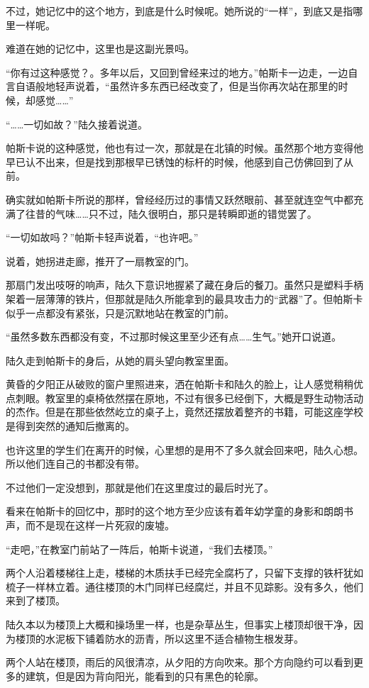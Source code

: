 不过，她记忆中的这个地方，到底是什么时候呢。她所说的“一样”，到底又是指哪里一样呢。

难道在她的记忆中，这里也是这副光景吗。

“你有过这种感觉？。多年以后，又回到曾经来过的地方。”帕斯卡一边走，一边自言自语般地轻声说着，“虽然许多东西已经改变了，但是当你再次站在那里的时候，却感觉……”

“……一切如故？”陆久接着说道。

帕斯卡说的这种感觉，他也有过一次，那就是在北镇的时候。虽然那个地方变得他早已认不出来，但是找到那根早已锈蚀的标杆的时候，他感到自己仿佛回到了从前。

确实就如帕斯卡所说的那样，曾经经历过的事情又跃然眼前、甚至就连空气中都充满了往昔的气味……只不过，陆久很明白，那只是转瞬即逝的错觉罢了。

“一切如故吗？”帕斯卡轻声说着，“也许吧。”

说着，她拐进走廊，推开了一扇教室的门。

那扇门发出吱呀的响声，陆久下意识地握紧了藏在身后的餐刀。虽然只是塑料手柄架着一层薄薄的铁片，但那就是陆久所能拿到的最具攻击力的“武器”了。但帕斯卡似乎一点都没有紧张，只是沉默地站在教室的门前。

“虽然多数东西都没有变，不过那时候这里至少还有点……生气。”她开口说道。

陆久走到帕斯卡的身后，从她的肩头望向教室里面。

黄昏的夕阳正从破败的窗户里照进来，洒在帕斯卡和陆久的脸上，让人感觉稍稍优点刺眼。教室里的桌椅依然摆在原地，不过有很多已经倒下，大概是野生动物活动的杰作。但是在那些依然屹立的桌子上，竟然还摆放着整齐的书籍，可能这座学校是得到突然的通知后撤离的。

也许这里的学生们在离开的时候，心里想的是用不了多久就会回来吧，陆久心想。所以他们连自己的书都没有带。

不过他们一定没想到，那就是他们在这里度过的最后时光了。

看来在帕斯卡的回忆中，那时的这个地方至少应该有着年幼学童的身影和朗朗书声，而不是现在这样一片死寂的废墟。

“走吧，”在教室门前站了一阵后，帕斯卡说道，“我们去楼顶。”

两个人沿着楼梯往上走，楼梯的木质扶手已经完全腐朽了，只留下支撑的铁杆犹如梳子一样林立着。通往楼顶的木门同样已经腐烂，并且不见踪影。没有多久，他们来到了楼顶。

陆久本以为楼顶上大概和操场里一样，也是杂草丛生，但事实上楼顶却很干净，因为楼顶的水泥板下铺着防水的沥青，所以这里不适合植物生根发芽。

两个人站在楼顶，雨后的风很清凉，从夕阳的方向吹来。那个方向隐约可以看到更多的建筑，但是因为背向阳光，能看到的只有黑色的轮廓。

